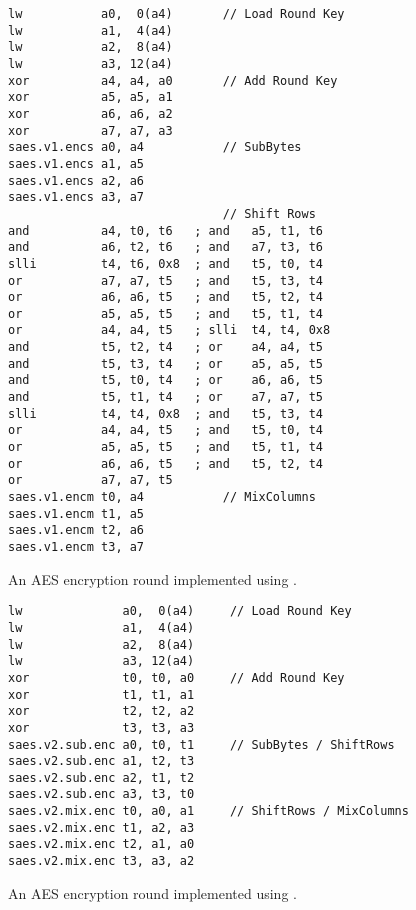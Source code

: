 \begin{figure}[!h]
\begin{lstlisting}[language=pseudo,style=block]
lw           a0,  0(a4)       // Load Round Key
lw           a1,  4(a4)
lw           a2,  8(a4)
lw           a3, 12(a4)
xor          a4, a4, a0       // Add Round Key
xor          a5, a5, a1
xor          a6, a6, a2
xor          a7, a7, a3
saes.v1.encs a0, a4           // SubBytes
saes.v1.encs a1, a5
saes.v1.encs a2, a6
saes.v1.encs a3, a7
                              // Shift Rows
and          a4, t0, t6   ; and   a5, t1, t6
and          a6, t2, t6   ; and   a7, t3, t6
slli         t4, t6, 0x8  ; and   t5, t0, t4
or           a7, a7, t5   ; and   t5, t3, t4
or           a6, a6, t5   ; and   t5, t2, t4
or           a5, a5, t5   ; and   t5, t1, t4
or           a4, a4, t5   ; slli  t4, t4, 0x8
and          t5, t2, t4   ; or    a4, a4, t5
and          t5, t3, t4   ; or    a5, a5, t5
and          t5, t0, t4   ; or    a6, a6, t5
and          t5, t1, t4   ; or    a7, a7, t5
slli         t4, t4, 0x8  ; and   t5, t3, t4
or           a4, a4, t5   ; and   t5, t0, t4
or           a5, a5, t5   ; and   t5, t1, t4
or           a6, a6, t5   ; and   t5, t2, t4
or           a7, a7, t5
saes.v1.encm t0, a4           // MixColumns
saes.v1.encm t1, a5
saes.v1.encm t2, a6
saes.v1.encm t3, a7
\end{lstlisting}
\caption{
  An AES encryption round implemented using .
}
\label{fig:v1:round}
\end{figure}

\begin{figure}[!h]
\begin{lstlisting}[language=pseudo,style=block]
lw              a0,  0(a4)     // Load Round Key
lw              a1,  4(a4)
lw              a2,  8(a4)
lw              a3, 12(a4)
xor             t0, t0, a0     // Add Round Key
xor             t1, t1, a1
xor             t2, t2, a2
xor             t3, t3, a3
saes.v2.sub.enc a0, t0, t1     // SubBytes / ShiftRows
saes.v2.sub.enc a1, t2, t3
saes.v2.sub.enc a2, t1, t2
saes.v2.sub.enc a3, t3, t0
saes.v2.mix.enc t0, a0, a1     // ShiftRows / MixColumns
saes.v2.mix.enc t1, a2, a3
saes.v2.mix.enc t2, a1, a0
saes.v2.mix.enc t3, a3, a2
\end{lstlisting}
\caption{
  An AES encryption round implemented using .
}
\label{fig:v2:round}
\end{figure}

